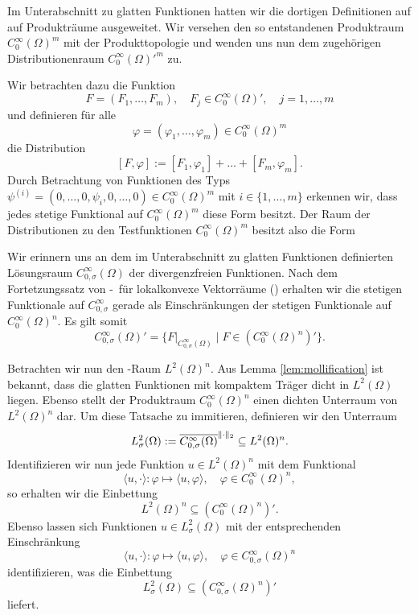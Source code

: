 Im Unterabschnitt zu glatten Funktionen hatten wir die dortigen Definitionen auf auf Produkträume ausgeweitet.
Wir versehen den so entstandenen Produktraum $C_0^\infty(\Omega)^m$ mit der Produkttopologie und wenden uns nun dem zugehörigen Distributionenraum $C_0^\infty(\Omega)'^m$ zu.

Wir betrachten dazu die Funktion
$$
  F = (F_1, \dots, F_m), \quad F_j \in C_0^\infty(\Omega)', \quad j = 1, \dots, m
$$
und definieren für alle 
$$\varphi = (\varphi_1, \dots, \varphi_m) \in C_0^\infty(\Omega)^m$$
die Distribution
\begin{equation}
  \label{eq:pairingVector}
  [F, \varphi] := [F_1, \varphi_1] + \dots + [F_m, \varphi_m].
\end{equation}
Durch Betrachtung von Funktionen des Typs $\psi^{(i)} = (0, \dots,0, \psi_i, 0,\dots,0) \in C_0^\infty(\Omega)^m$ mit $i \in \{1,\dots,m\}$ erkennen wir, dass jedes stetige Funktional auf $C_0^\infty(\Omega)^m$ diese Form besitzt.
Der Raum der Distributionen zu den Testfunktionen $C_0^\infty(\Omega)^m$ besitzt also die Form

Wir erinnern uns an dem im Unterabschnitt zu glatten Funktionen definierten Lösungsraum $C_{0, \sigma}^\infty(\Omega)$ der divergenzfreien Funktionen.
Nach dem Fortetzungssatz von \hahn\hyp{}\banach\ für lokalkonvexe Vektorräume (\cite[S.408, Satz VIII.2.8]{werner2011fa}) erhalten wir die stetigen Funktionale auf $C_{0,\sigma}^\infty$ gerade als Einschränkungen der stetigen Funktionale auf $C_0^\infty(\Omega)^n$. Es gilt somit
$$
C_{0,\sigma}^\infty(\Omega)' = \{F|_{C_{0,\sigma}^\infty(\Omega)} \mid F \in (C_0^\infty(\Omega)^n)'\}.
$$

Betrachten wir nun den \hilbert\hyp{}Raum $L^2(\Omega)^n$.
Aus Lemma \ref{lem:mollification} ist bekannt, dass die glatten Funktionen mit kompaktem Träger dicht in $L^2(\Omega)$ liegen. 
Ebenso stellt der Produktraum $C_0^\infty(\Omega)^n$ einen dichten Unterraum von $L^2(\Omega)^n$ dar.
Um diese Tatsache zu immitieren, definieren wir den Unterraum 
$$
  L^2_\sigma(\Omega) 
  := \overline{C_{0,\sigma}^\infty(\Omega)}^{\lVert \cdot \rVert_2}
  \subseteq L^2(\Omega)^n.
$$
Identifizieren wir nun jede Funktion $u \in L^2(\Omega)^n$ mit dem Funktional
$$
\langle u, \cdot \rangle \colon \varphi \mapsto \langle u, \varphi \rangle, \quad \varphi \in C_0^\infty(\Omega)^n,
$$
so erhalten wir die Einbettung 
$$
  L^2(\Omega)^n \subseteq (C_0^\infty(\Omega)^n)'.
$$
Ebenso lassen sich Funktionen $u \in L^2_\sigma(\Omega)$ mit der entsprechenden Einschränkung
$$
\langle u, \cdot \rangle \colon \varphi \mapsto \langle u, \varphi \rangle, \quad \varphi \in C_{0,\sigma}^\infty(\Omega)^n
$$
identifizieren, was die Einbettung
$$
  L^2_\sigma(\Omega) \subseteq (C_{0,\sigma}^\infty(\Omega)^n)'
$$
liefert.

